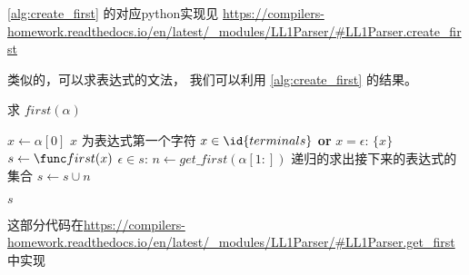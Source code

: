 \documentclass[../report]{subfiles}
\begin{document}
\cref{alg:create_first} 的对应python实现见
\url{https://compilers-homework.readthedocs.io/en/latest/_modules/LL1Parser/#LL1Parser.create_first}

类似的，可以求表达式的文法，
我们可以利用
\cref{alg:create_first}
的结果。


\begin{algorithm}[H]
  \caption{求 $first(\alpha)$}
  \begin{codebox}
      \li $x \gets \alpha[0]$ \Comment $x$ 为表达式第一个字符
      \li \If $x \in \id{terminals}$ \textbf{or} $x = \epsilon$:
      \Then
        \li \Return $\{ x \}$
      \End
      \li $s \gets \first(x)$
      \li \While $\epsilon \in s$:
      \Then
        \li $n \gets  get\_first(\alpha[1:])$
          \Comment 递归的求出接下来的表达式的\first 集合
        \li $s \gets s \cup n$
      \End

      \li \Return $s$
  \end{codebox}
  \label{alg:first}
\end{algorithm}

这部分代码在\url{https://compilers-homework.readthedocs.io/en/latest/_modules/LL1Parser/#LL1Parser.get_first}中实现
\end{document}
